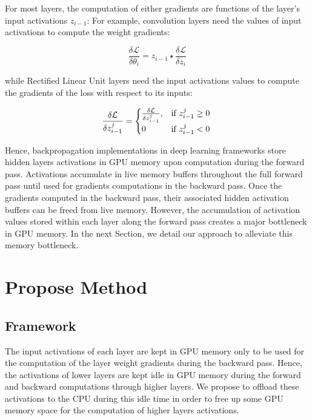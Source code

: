 \documentclass[11pt,onecolumn]{article}
\begin{document}
For most layers, the computation of either gradients are functions of the layer's input activations $z_{i-1}$:
For example, convolution layers need the values of input activations to compute the weight gradients:

\begin{equation}
\frac{\delta \mathcal{L}}{\delta \theta_i} = z_{i-1} \star \frac{\delta \mathcal{L}}{\delta z_i} 
\end{equation}

while Rectified Linear Unit layers need the input activations values 
to compute the gradients of the loss with respect to its inputs:

\begin{equation}
\frac{\delta \mathcal{L}}{\delta z_{i-1}^j}  = \begin{cases}
\frac{\delta \mathcal{L}}{\delta z_{i-1}^j}, & \text{if}\ z_{i-1}^j \geq 0 \\
0 & \text{if}\ z_{i-1}^j < 0
\end{cases} \\
\end{equation}

Hence, backpropagation implementations in deep learning frameworks
store hidden layers activations in GPU memory 
upon computation during the forward pass. 
Activations accumulate in live memory buffers throughout the full forward pass
until used for gradients computations in the backward pass. 
Once the gradients computed in the backward pass, 
their associated hidden activation buffers can be freed from live memory. 
However, the accumulation of activation values stored within each layer 
along the forward pass creates a major bottleneck in GPU memory.
In the next Section, we detail our approach to alleviate this memory bottleneck.

\section{Propose Method}
\subsection{Framework}

The input activations of each layer are kept in GPU memory only to be used for the
computation of the layer weight gradients during the backward pass. 
Hence, the activations of lower layers are kept idle in GPU memory during the
forward and backward computations through higher layers.
We propose to offload these activations to the CPU during this idle time
in order to free up some GPU memory space for the computation of higher layers activations.
\end{document}
